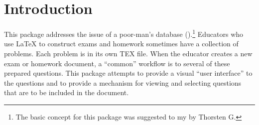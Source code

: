 \documentclass{article}
\begin{document}
\maketitle

\tableofcontents
{}

%
%

\section{Introduction}

This package addresses the issue of a poor-man's database
().\footnote{The basic concept for this package was suggested to my
by Thorsten G.} Educators who use {\LaTeX} to construct exams and homework
sometimes have a collection of problems. Each problem is in its own TEX file.
When the educator creates a new exam or homework document, a ``common''
workflow is to  several of these prepared questions. This package
attempts to provide a visual ``user interface'' to the questions and to
provide a mechanism for viewing and selecting questions that are to be
included in the document.
\end{document}
